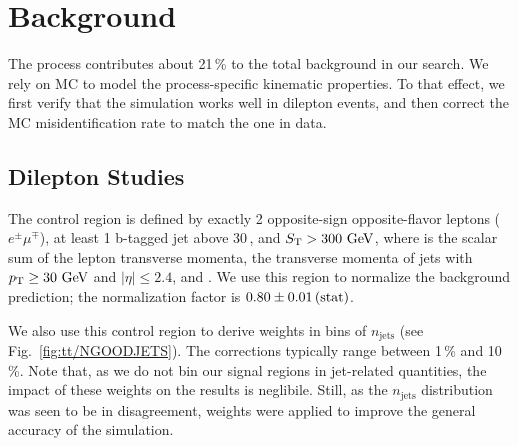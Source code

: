 \section{\texorpdfstring{\ttbar}{TTbar} Background}
\label{sec:bkg_tt}

The \ttbar process contributes about 21\,\% to the total background in our search. We rely on MC to model the process-specific kinematic properties. To that effect, we first verify that the simulation works well in dilepton events, and then correct the MC misidentification rate to match the one in data.

\subsection{Dilepton Studies}
The \ttbar control region is defined by exactly 2 opposite-sign opposite-flavor leptons ($e^\pm \mu^\mp$), at least 1 b-tagged jet above 30\,\GeV, and $S_{\mathrm{T}} > 300\,\,\text{Ge\hspace{-.08em}V}$, where \ST is the scalar sum of the lepton transverse momenta, the transverse momenta of jets with $p_{\mathrm{T}} \geq 30\,\,\text{Ge\hspace{-.08em}V}$ and $|\eta| \leq 2.4$, and \MET. We use this region to normalize the background prediction; the normalization factor is $0.80 \pm 0.01\,\text{(stat)}$.

We also use this control region to derive weights in bins of $n_\textrm{jets}$ (see Fig.~\ref{fig:tt/NGOODJETS}). The corrections typically range between 1\,\% and 10\,\%. Note that, as we do not bin our signal regions in jet-related quantities, the impact of these weights on the results is neglibile. Still, as the $n_\textrm{jets}$ distribution was seen to be in disagreement, weights were applied to improve the general accuracy of the simulation.

